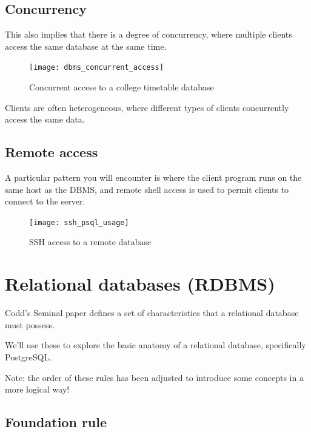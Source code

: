\documentclass[slides]{pgnotes}
\begin{document}
\subsection{Concurrency}
\label{sec:concurrency}

This also implies that there is a degree of concurrency, where multiple
clients access the same database at the same time.

\begin{figure}[htbp]
  \centering
  \texttt{[image: dbms\_concurrent\_access]}
  \caption{Concurrent access to a college timetable database}
  \label{fig:concurrent-access}
\end{figure}

Clients are often heterogeneous, where different types of clients concurrently access the same data.



\subsection{Remote access}

A particular pattern you will encounter is where the client program runs on the same host as the DBMS, and remote shell access is used to permit clients to connect to the server.

\begin{figure}[htbp]
  \centering
  \texttt{[image: ssh\_psql\_usage]}
  \caption{SSH access to a remote database}
  \label{fig:ssh-psql-usage}
\end{figure}





\section{Relational databases (RDBMS)}\label{sec:relational-databases}

Codd's Seminal paper defines a set of characteristics that a relational database must possess.

We'll use these to explore the basic anatomy of a relational database, specifically PostgreSQL.

Note: the order of these rules has been adjusted to introduce some concepts in a more logical way!


\subsection{Foundation rule}
\end{document}
